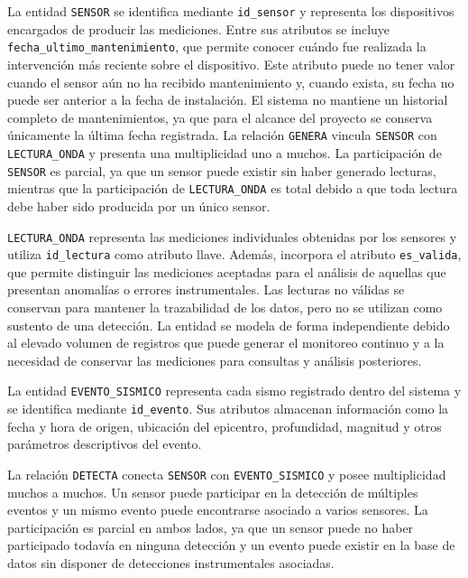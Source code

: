 \documentclass[12pt,a4paper]{article}
\begin{document}
La entidad \texttt{SENSOR} se identifica mediante \texttt{id\_\allowbreak{}sensor} y representa los dispositivos encargados de producir las mediciones. Entre sus atributos se incluye \texttt{fecha\_\allowbreak{}ultimo\_\allowbreak{}mantenimiento}, que permite conocer cuándo fue realizada la intervención más reciente sobre el dispositivo. Este atributo puede no tener valor cuando el sensor aún no ha recibido mantenimiento y, cuando exista, su fecha no puede ser anterior a la fecha de instalación. El sistema no mantiene un historial completo de mantenimientos, ya que para el alcance del proyecto se conserva únicamente la última fecha registrada. La relación \texttt{GENERA} vincula \texttt{SENSOR} con \texttt{LECTURA\_\allowbreak{}ONDA} y presenta una multiplicidad uno a muchos. La participación de \texttt{SENSOR} es parcial, ya que un sensor puede existir sin haber generado lecturas, mientras que la participación de \texttt{LECTURA\_\allowbreak{}ONDA} es total debido a que toda lectura debe haber sido producida por un único sensor.

\texttt{LECTURA\_\allowbreak{}ONDA} representa las mediciones individuales obtenidas por los sensores y utiliza \texttt{id\_\allowbreak{}lectura} como atributo llave. Además, incorpora el atributo \texttt{es\_\allowbreak{}valida}, que permite distinguir las mediciones aceptadas para el análisis de aquellas que presentan anomalías o errores instrumentales. Las lecturas no válidas se conservan para mantener la trazabilidad de los datos, pero no se utilizan como sustento de una detección. La entidad se modela de forma independiente debido al elevado volumen de registros que puede generar el monitoreo continuo y a la necesidad de conservar las mediciones para consultas y análisis posteriores.

La entidad \texttt{EVENTO\_\allowbreak{}SISMICO} representa cada sismo registrado dentro del sistema y se identifica mediante \texttt{id\_\allowbreak{}evento}. Sus atributos almacenan información como la fecha y hora de origen, ubicación del epicentro, profundidad, magnitud y otros parámetros descriptivos del evento.

La relación \texttt{DETECTA} conecta \texttt{SENSOR} con \texttt{EVENTO\_\allowbreak{}SISMICO} y posee multiplicidad muchos a muchos. Un sensor puede participar en la detección de múltiples eventos y un mismo evento puede encontrarse asociado a varios sensores. La participación es parcial en ambos lados, ya que un sensor puede no haber participado todavía en ninguna detección y un evento puede existir en la base de datos sin disponer de detecciones instrumentales asociadas.
\end{document}
